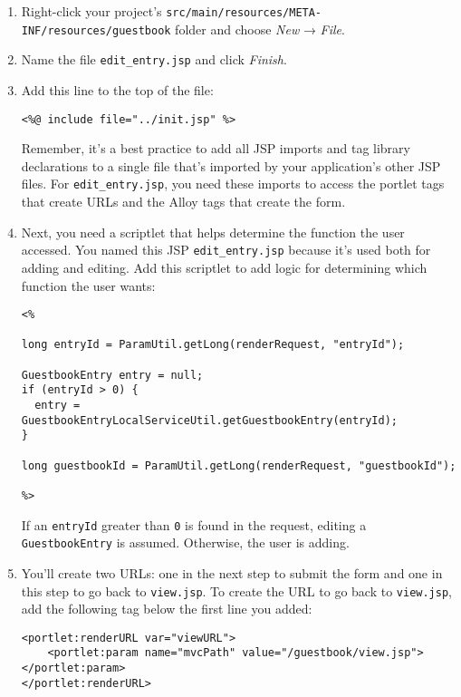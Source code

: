 \begin{enumerate}
\def\labelenumi{\arabic{enumi}.}
\item
  Right-click your project's
  \texttt{src/main/resources/META-INF/resources/guestbook} folder and
  choose \emph{New} → \emph{File}.
\item
  Name the file \texttt{edit\_entry.jsp} and click \emph{Finish}.
\item
  Add this line to the top of the file:

\begin{verbatim}
<%@ include file="../init.jsp" %>
\end{verbatim}

  Remember, it's a best practice to add all JSP imports and tag library
  declarations to a single file that's imported by your application's
  other JSP files. For \texttt{edit\_entry.jsp}, you need these imports
  to access the portlet tags that create URLs and the Alloy tags that
  create the form.
\item
  Next, you need a scriptlet that helps determine the function the user
  accessed. You named this JSP \texttt{edit\_entry.jsp} because it's
  used both for adding and editing. Add this scriptlet to add logic for
  determining which function the user wants:

\begin{verbatim}
<% 

long entryId = ParamUtil.getLong(renderRequest, "entryId");

GuestbookEntry entry = null;
if (entryId > 0) {
  entry = GuestbookEntryLocalServiceUtil.getGuestbookEntry(entryId);
}

long guestbookId = ParamUtil.getLong(renderRequest, "guestbookId");

%>
\end{verbatim}

  If an \texttt{entryId} greater than \texttt{0} is found in the
  request, editing a \texttt{GuestbookEntry} is assumed. Otherwise, the
  user is adding.
\item
  You'll create two URLs: one in the next step to submit the form and
  one in this step to go back to \texttt{view.jsp}. To create the URL to
  go back to \texttt{view.jsp}, add the following tag below the first
  line you added:

\begin{verbatim}
<portlet:renderURL var="viewURL">
    <portlet:param name="mvcPath" value="/guestbook/view.jsp"></portlet:param>
</portlet:renderURL>
\end{verbatim}
\end{enumerate}

